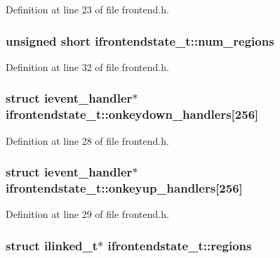 Definition at line 23 of file frontend.\-h.

\hypertarget{structifrontendstate__t_ad30593dd0b69372008108075c55cfe27}{
\subsubsection[{num\-\_\-regions}]{\setlength{\rightskip}{0pt plus 5cm}unsigned short ifrontendstate\-\_\-t\-::num\-\_\-regions}}\label{structifrontendstate__t_ad30593dd0b69372008108075c55cfe27}


Definition at line 32 of file frontend.\-h.

\hypertarget{structifrontendstate__t_ad8fd468eaec37b949af562b39ad20d5a}{
\subsubsection[{onkeydown\-\_\-handlers}]{\setlength{\rightskip}{0pt plus 5cm}struct {\bf ievent\-\_\-handler}$\ast$ ifrontendstate\-\_\-t\-::onkeydown\-\_\-handlers\mbox{[}256\mbox{]}}}\label{structifrontendstate__t_ad8fd468eaec37b949af562b39ad20d5a}


Definition at line 28 of file frontend.\-h.

\hypertarget{structifrontendstate__t_a5bb9423c4ba5f86cd8a0d50575031952}{
\subsubsection[{onkeyup\-\_\-handlers}]{\setlength{\rightskip}{0pt plus 5cm}struct {\bf ievent\-\_\-handler}$\ast$ ifrontendstate\-\_\-t\-::onkeyup\-\_\-handlers\mbox{[}256\mbox{]}}}\label{structifrontendstate__t_a5bb9423c4ba5f86cd8a0d50575031952}


Definition at line 29 of file frontend.\-h.

\hypertarget{structifrontendstate__t_a42ce77321ecea4fde68dd68b7f0f2283}{
\subsubsection[{regions}]{\setlength{\rightskip}{0pt plus 5cm}struct {\bf ilinked\-\_\-t}$\ast$ ifrontendstate\-\_\-t\-::regions}}\label{structifrontendstate__t_a42ce77321ecea4fde68dd68b7f0f2283}


